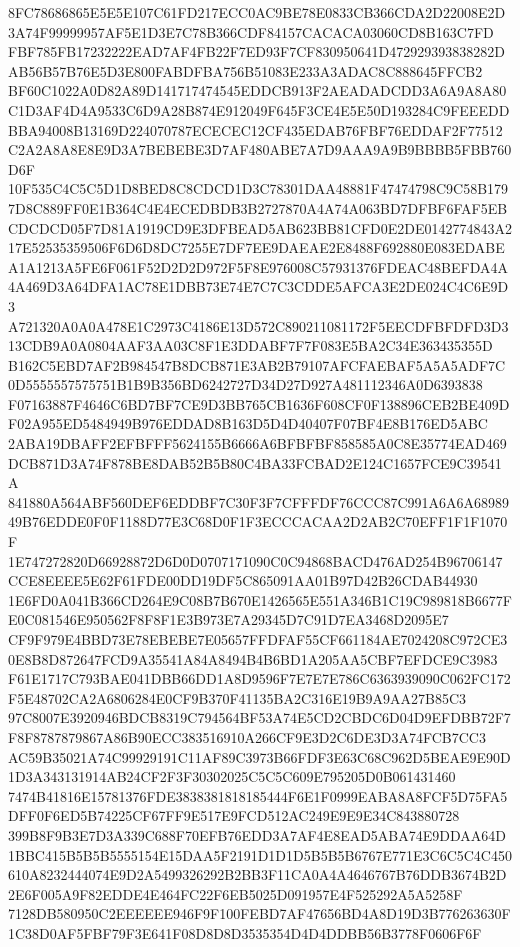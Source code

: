 \documentclass[UTF8,fontset=fandol,zihao=-4,a4paper]{ctexart}
\begin{document}
{{8FC78686865E5E5E107C61FD217ECC0AC9BE78E0833CB366CDA2D22008E2D3A74F99999957AF5E1D3E7C78B366CDF84157CACACA03060CD8B163C7FD
FBF785FB17232222EAD7AF4FB22F7ED93F7CF830950641D472929393838282DAB56B57B76E5D3E800FABDFBA756B51083E233A3ADAC8C888645FFCB2
BF60C1022A0D82A89D141717474545EDDCB913F2AEADADCDD3A6A9A8A80C1D3AF4D4A9533C6D9A28B874E912049F645F3CE4E5E50D193284C9FEEEDD
BBA94008B13169D224070787ECECEC12CF435EDAB76FBF76EDDAF2F77512C2A2A8A8E8E9D3A7BEBEBE3D7AF480ABE7A7D9AAA9A9B9BBBB5FBB760D6F
10F535C4C5C5D1D8BED8C8CDCD1D3C78301DAA48881F47474798C9C58B1797D8C889FF0E1B364C4E4ECEDBDB3B2727870A4A74A063BD7DFBF6FAF5EB
CDCDCD05F7D81A1919CD9E3DFBEAD5AB623BB81CFD0E2DE0142774843A217E52535359506F6D6D8DC7255E7DF7EE9DAEAE2E8488F692880E083EDABE
A1A1213A5FE6F061F52D2D2D972F5F8E976008C57931376FDEAC48BEFDA4A4A469D3A64DFA1AC78E1DBB73E74E7C7C3CDDE5AFCA3E2DE024C4C6E9D3
A721320A0A0A478E1C2973C4186E13D572C890211081172F5EECDFBFDFD3D313CDB9A0A0804AAF3AA03C8F1E3DDABF7F7F083E5BA2C34E363435355D
B162C5EBD7AF2B984547B8DCB871E3AB2B79107AFCFAEBAF5A5A5ADF7C0D5555557575751B1B9B356BD6242727D34D27D927A481112346A0D6393838
F07163887F4646C6BD7BF7CE9D3BB765CB1636F608CF0F138896CEB2BE409DF02A955ED5484949B976EDDAD8B163D5D4D40407F07BF4E8B176ED5ABC
2ABA19DBAFF2EFBFFF5624155B6666A6BFBFBF858585A0C8E35774EAD469DCB871D3A74F878BE8DAB52B5B80C4BA33FCBAD2E124C1657FCE9C39541A
841880A564ABF560DEF6EDDBF7C30F3F7CFFFDF76CCC87C991A6A6A6898949B76EDDE0F0F1188D77E3C68D0F1F3ECCCACAA2D2AB2C70EFF1F1F1070F
1E747272820D66928872D6D0D0707171090C0C94868BACD476AD254B96706147CCE8EEEE5E62F61FDE00DD19DF5C865091AA01B97D42B26CDAB44930
1E6FD0A041B366CD264E9C08B7B670E1426565E551A346B1C19C989818B6677FE0C081546E950562F8F8F1E3B973E7A29345D7C91D7EA3468D2095E7
CF9F979E4BBD73E78EBEBE7E05657FFDFAF55CF661184AE7024208C972CE30E8B8D872647FCD9A35541A84A8494B4B6BD1A205AA5CBF7EFDCE9C3983
F61E1717C793BAE041DBB66DD1A8D9596F7E7E7E786C6363939090C062FC172F5E48702CA2A6806284E0CF9B370F41135BA2C316E19B9A9AA27B85C3
97C8007E3920946BDCB8319C794564BF53A74E5CD2CBDC6D04D9EFDBB72F7F8F8787879867A86B90ECC383516910A266CF9E3D2C6DE3D3A74FCB7CC3
AC59B35021A74C99929191C11AF89C3973B66FDF3E63C68C962D5BEAE9E90D1D3A343131914AB24CF2F3F30302025C5C5C609E795205D0B061431460
7474B41816E15781376FDE3838381818185444F6E1F0999EABA8A8FCF5D75FA5DFF0F6ED5B74225CF67FF9E517E9FCD512AC249E9E9E34C843880728
399B8F9B3E7D3A339C688F70EFB76EDD3A7AF4E8EAD5ABA74E9DDAA64D1BBC415B5B5B5555154E15DAA5F2191D1D1D5B5B5B6767E771E3C6C5C4C450
610A8232444074E9D2A5499326292B2BB3F11CA0A4A4646767B76DDB3674B2D2E6F005A9F82EDDE4E464FC22F6EB5025D091957E4F525292A5A5258F
7128DB580950C2EEEEEE946F9F100FEBD7AF47656BD4A8D19D3B776263630F1C38D0AF5FBF79F3E641F08D8D8D3535354D4D4DDBB56B3778F0606F6F
}}
\end{document}
